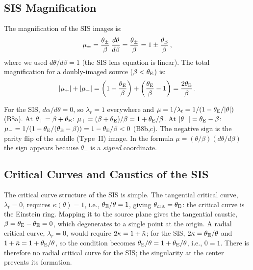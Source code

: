 \subsection{SIS Magnification}

The magnification of the SIS images is:
\begin{equation}
    \mu_\pm = \frac{\theta_\pm}{\beta}\,
    \frac{d\theta}{d\beta}
    = \frac{\theta_\pm}{\beta} = 1 \pm \frac{\theta_{\mathrm{E}}}{\beta} \,,
    \label{eq:sis_magnification}
\end{equation}
where we used $d\theta/d\beta = 1$ (the SIS lens equation is
linear).  The total magnification for a doubly-imaged source
($\beta < \theta_{\mathrm{E}}$) is:
\begin{equation}
    |\mu_+| + |\mu_-| = \left(1 + \frac{\theta_{\mathrm{E}}}{\beta}\right)
    + \left(\frac{\theta_{\mathrm{E}}}{\beta} - 1\right)
    = \frac{2\theta_{\mathrm{E}}}{\beta} \,.
    \label{eq:sis_total_mag}
\end{equation}

\begin{derivation}
For the SIS, $d\alpha/d\theta = 0$, so $\lambda_r = 1$ everywhere and
$\mu = 1/\lambda_t = 1/(1-\theta_{\mathrm{E}}/|\theta|)$ (B8a).  At $\theta_+ = \beta+\theta_{\mathrm{E}}$:
$\mu_+ = (\beta+\theta_{\mathrm{E}})/\beta = 1+\theta_{\mathrm{E}}/\beta$.  At $|\theta_-| = \theta_{\mathrm{E}}-\beta$:
$\mu_- = 1/(1-\theta_{\mathrm{E}}/(\theta_{\mathrm{E}}-\beta)) = 1-\theta_{\mathrm{E}}/\beta<0$ (B8b,c).  The
negative sign is the parity flip of the saddle (Type~II) image.  In the
formula $\mu = (\theta/\beta)(d\theta/d\beta)$ the sign appears because
$\theta_-$ is a \emph{signed} coordinate.
\end{derivation}

\subsection{Critical Curves and Caustics of the SIS}

The critical curve structure of the SIS is simple.  The tangential
critical curve, $\lambda_t = 0$, requires $\bar{\kappa}(\theta) = 1$,
i.e., $\theta_{\mathrm{E}}/\theta = 1$, giving $\theta_{\mathrm{crit}} = \theta_{\mathrm{E}}$:
the critical curve is the Einstein ring.  Mapping it to the source
plane gives the tangential caustic, $\beta = \theta_{\mathrm{E}} - \theta_{\mathrm{E}} = 0$,
which degenerates to a single point at the origin.  A radial critical
curve, $\lambda_r = 0$, would require $2\kappa = 1 + \bar{\kappa}$;
for the SIS, $2\kappa = \theta_{\mathrm{E}}/\theta$ and
$1 + \bar{\kappa} = 1 + \theta_{\mathrm{E}}/\theta$, so the condition becomes
$\theta_{\mathrm{E}}/\theta = 1 + \theta_{\mathrm{E}}/\theta$, i.e., $0 = 1$.  There is
therefore no radial critical curve for the SIS; the singularity at
the center prevents its formation.

